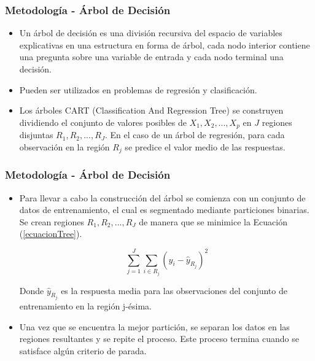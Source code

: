 \documentclass{beamer}
\begin{document}
\begin{frame}[t]
\frametitle{Metodología -  Árbol de Decisión }

\vfill
\begin{itemize}
\item 
Un árbol de decisión es una división recursiva del espacio de variables explicativas en una estructura en forma de árbol, cada nodo interior contiene una pregunta sobre una variable de entrada y cada nodo terminal una decisión. 
\item Pueden ser utilizados en problemas de regresión y clasificación. 
\item 
Los árboles CART (Classification And Regression Tree) se construyen dividiendo el conjunto de valores posibles de $X_1,X_2,...,X_p$ en $J$ regiones disjuntas $R_1, R_2,..., R_J$. En el caso de un árbol de regresión, para cada observación en la región $R_j$ se predice el valor medio de las respuestas.

\vfill
\end{itemize}

\end{frame}

\begin{frame}[t]
\frametitle{ Metodología -  Árbol de Decisión}

\vfill
\begin{itemize}

\item 
Para llevar a cabo la construcción del árbol se comienza con un conjunto de datos de entrenamiento, el cual es segmentado mediante particiones binarias. Se crean regiones $R_1, R_2,..., R_J$ de manera que se minimice la Ecuación (\ref{ecuacionTree}).


\begin{equation}
\sum_{j=1}^{J} \sum_{i \in R_{j}}\left(y_{i}-\hat{y}_{R_{j}}\right)^{2}
\label{ecuacionTree}
\end{equation}


Donde $\hat{y}_{R_{j}}$ es la respuesta media para las observaciones del conjunto de entrenamiento en la región j-ésima.
\item
Una vez que se encuentra la mejor partición, se separan los datos en las regiones resultantes y se repite el proceso. Este proceso termina cuando se satisface algún criterio de parada.
\vfill
\end{itemize}

\end{frame}
\end{document}
